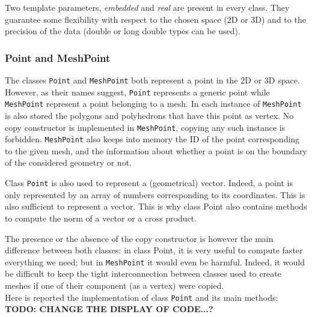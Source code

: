 Two template parameters, \textit{embedded} and \textit{real} are present in every class. They guarantee some flexibility with respect to the chosen space ($2$D or $3$D) and to the precision of the data (double or long double types can be used). 

\subsubsection{Point and MeshPoint} \label{pts}
The classes \verb|Point| and \verb|MeshPoint| both represent a point in the $2$D or $3$D space. However, as their names suggest, \verb|Point| represents a generic point while \verb|MeshPoint| represent a point belonging to a mesh. In each instance of \verb|MeshPoint| is also stored the polygons and polyhedrons that have this point as vertex. No copy constructor is implemented in \verb|MeshPoint|, copying any such instance is forbidden. \verb|MeshPoint| also keeps into memory the ID of the point corresponding to the given mesh, and the information about whether a point is on the boundary of the considered geometry or not. 

Class \verb|Point| is also used to represent a (geometrical) vector. Indeed, a point is only represented by an array of numbers corresponding to its coordinates. This is also sufficient to represent a vector. This is why class Point also contains methods to compute the norm of a vector or a cross product. 

The presence or the absence of the copy constructor is however the main difference between both classes: in class Point, it is very useful to compute faster everything we need; but in \verb|MeshPoint| it would even be harmful. Indeed, it would be difficult to keep the tight interconnection between classes used to create meshes if one of their component (as a vertex) were copied. \\

Here is reported the implementation of class \verb|Point| and its main methods: \\

\textbf{TODO: CHANGE THE DISPLAY OF CODE...?}

